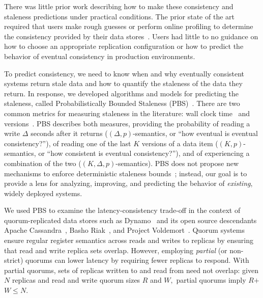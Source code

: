 There was little prior work describing how to make these consistency
and staleness predictions under practical conditions.  The prior
state of the art required that users make rough guesses or perform
online profiling to determine the consistency provided by their data
stores~\cite{bermbach-eventual,podc-hpl,wada-data}. Users
had little to no guidance on how to choose an appropriate replication
configuration or how to predict the behavior of eventual consistency
in production environments.

To predict consistency, we need to know when and why eventually
consistent systems return stale data and how to quantify the staleness
of the data they return.  In response, we developed algorithms and
models for predicting the staleness, called Probabilistically Bounded
Staleness (PBS)~\cite{pbs,pbs-vldbj2013,pbs-demo-sigmod2013}. There are two common metrics for measuring staleness
in the literature: wall clock
time~\cite{podc-hpl,timed-consistency,yu-conit,vahdat-bounded}
and versions~\cite{podc-hpl,aqua,frac}.  PBS describes both measures,
providing the probability of reading a write $\Delta$ seconds after it
returns ($(\Delta, p)$-semantics, or ``how eventual is eventual
consistency?''), of reading one of the last $K$ versions of a data
item ($(K, p)$-semantics, or ``how consistent is eventual
consistency?''), and of experiencing a combination of the two ($(K,
\Delta, p)$-semantics). PBS does not propose new mechanisms to enforce
deterministic staleness
bounds~\cite{aqua,trapp,yu-conit,vahdat-bounded,frac}; instead,
our goal is to provide a lens for analyzing, improving, and predicting
the behavior of \textit{existing}, widely deployed systems.

We used PBS to examine the latency-consistency trade-off in the
context of quorum-replicated data stores such as Dynamo~\cite{dynamo}
and its open source descendants Apache
Cassandra~\cite{cassandra-sigmod}, Basho Riak~\cite{riak}, and Project
Voldemort~\cite{voldemortpub}. Quorum systems ensure regular register
semantics across reads and writes to replicas by ensuring that read
and write replica sets overlap. However, employing \textit{partial}
(or non-strict) quorums can lower latency by requiring fewer replicas
to respond.  With partial quorums, sets of replicas written to and
read from need not overlap: given $N$ replicas and read and write
quorum sizes $R$ and $W,$ partial quorums imply $R$$+$$W$$\leq$$N$.

